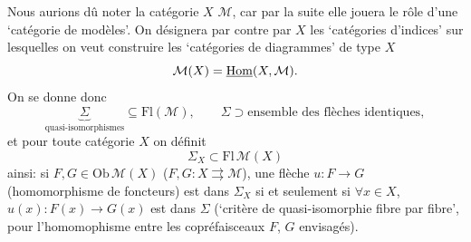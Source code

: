Nous aurions dû noter la catégorie $X$ $\mathcal{M}$, car par la suite elle jouera le rôle d'une `catégorie de modèles'. On désignera par contre par $X$ les `catégories d'indices' sur lesquelles on veut construire les `catégories de diagrammes' de type $X$
\[
\mathcal{M}(X) = \underline{\mathrm{Hom}}(X,\mathcal{M}).
\]
On se donne donc
\[
\underbrace{\Sigma}_{\text{quasi-isomorphismes}} \subseteq \mathrm{Fl}(\mathcal{M}), \qquad \Sigma \supset \text{ensemble des flèches identiques},
\]
et pour toute catégorie $X$ on définit
\[
\Sigma_X \subset \mathrm{Fl}\,\mathcal{M}(X)
\]
ainsi: si $F, G \in \mathrm{Ob}\,\mathcal{M}(X)$ ($F, G : X \rightrightarrows \mathcal{M}$), une flèche $u : F \longrightarrow G$ (homomorphisme de foncteurs) est dans $\Sigma_X$ si et seulement si $\forall x \in X$, $u(x) : F(x) \longrightarrow G(x)$ est dans $\Sigma$ (`critère de quasi-isomorphie fibre par fibre', pour l'homomophisme entre les copréfaisceaux $F$, $G$ envisagés). %

